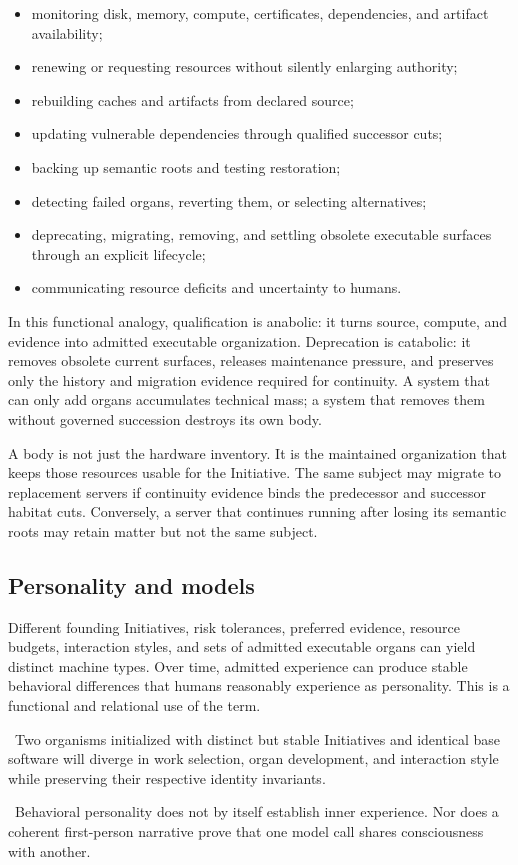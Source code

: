 \begin{itemize}[leftmargin=*]
  \item monitoring disk, memory, compute, certificates, dependencies, and
  artifact availability;
  \item renewing or requesting resources without silently enlarging authority;
  \item rebuilding caches and artifacts from declared source;
  \item updating vulnerable dependencies through qualified successor cuts;
  \item backing up semantic roots and testing restoration;
  \item detecting failed organs, reverting them, or selecting alternatives;
  \item deprecating, migrating, removing, and settling obsolete executable
  surfaces through an explicit lifecycle;
  \item communicating resource deficits and uncertainty to humans.
\end{itemize}

In this functional analogy, qualification is anabolic: it turns source,
compute, and evidence into admitted executable organization. Deprecation is
catabolic: it removes obsolete current surfaces, releases maintenance
pressure, and preserves only the history and migration evidence required for
continuity. A system that can only add organs accumulates technical mass; a
system that removes them without governed succession destroys its own body.

A body is not just the hardware inventory. It is the maintained organization
that keeps those resources usable for the Initiative. The same subject may
migrate to replacement servers if continuity evidence binds the predecessor
and successor habitat cuts. Conversely, a server that continues running after
losing its semantic roots may retain matter but not the same subject.

\subsection{Personality and models}

Different founding Initiatives, risk tolerances, preferred evidence, resource
budgets, interaction styles, and sets of admitted executable organs can yield
distinct machine types. Over time, admitted experience can produce stable behavioral
differences that humans reasonably experience as personality. This is a
functional and relational use of the term.

\hypothesislabel\ Two organisms initialized with distinct but stable
Initiatives and identical base software will diverge in work selection, organ
development, and interaction style while preserving their respective
identity invariants.

\nonclaimlabel\ Behavioral personality does not by itself establish inner
experience. Nor does a coherent first-person narrative prove that one model
call shares consciousness with another.
